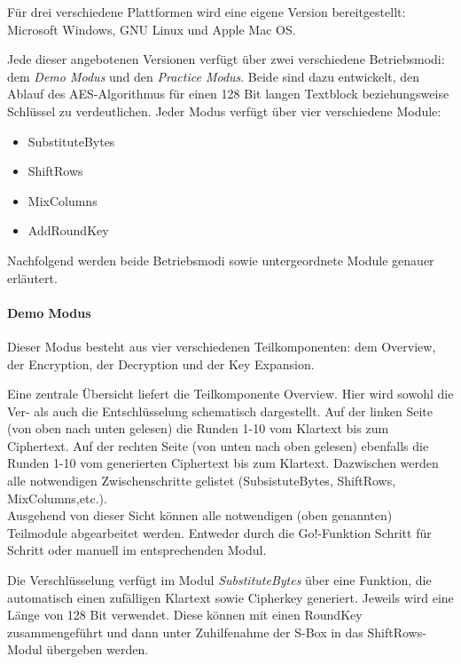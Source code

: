    Für drei verschiedene Plattformen wird eine eigene Version bereitgestellt:
   Microsoft Windows, GNU Linux und Apple Mac OS.

   Jede dieser angebotenen Versionen verfügt über zwei verschiedene Betriebsmodi: dem \textit{Demo Modus}
   und den \textit{Practice Modus}. Beide sind dazu entwickelt, den Ablauf des AES-Algorithmus für
   einen 128 Bit langen Textblock beziehungsweise Schlüssel zu verdeutlichen\cite{michiganuni}.
   Jeder Modus verfügt über vier verschiedene Module:

   \begin{itemize}
      \item SubstituteBytes
      \item ShiftRows
      \item MixColumns
      \item AddRoundKey
   \end{itemize}

   Nachfolgend werden beide Betriebsmodi sowie untergeordnete Module genauer erläutert.

   \paragraph{Demo Modus}
   Dieser Modus besteht aus vier verschiedenen Teilkomponenten: dem Overview, der Encryption,
   der Decryption und der Key Expansion.

   Eine zentrale Übersicht liefert die Teilkomponente Overview. Hier wird sowohl die Ver- als auch die
   Entschlüsselung schematisch dargestellt. Auf der linken Seite (von oben nach unten gelesen) die
   Runden 1-10 vom Klartext bis zum Ciphertext. Auf der rechten Seite (von unten nach oben gelesen)
   ebenfalls die Runden 1-10 vom generierten Ciphertext bis zum Klartext. Dazwischen werden alle
   notwendigen Zwischenschritte gelistet (SubsistuteBytes, ShiftRows, MixColumns,etc.). \\
   Ausgehend von dieser Sicht können alle notwendigen (oben genannten) Teilmodule abgearbeitet werden.
   Entweder durch die Go!-Funktion Schritt für Schritt oder manuell im entsprechenden Modul.

   Die Verschlüsselung verfügt im Modul \textit{SubstituteBytes} über eine Funktion,
   die automatisch einen zufälligen Klartext sowie
   Cipherkey generiert. Jeweils wird eine Länge von 128 Bit verwendet.
   Diese können mit einen RoundKey zusammengeführt und dann unter Zuhilfenahme
   der S-Box in das ShiftRows-Modul übergeben werden.

